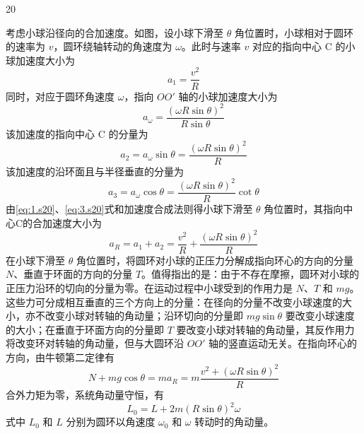 \begin{solution}{20}
    \begin{subsolution}
        考虑小球沿径向的合加速度。如图，设小球下滑至 $\theta$ 角位置时，小球相对于圆环的速率为 $v$，圆环绕轴转动的角速度为 $\omega$。此时与速率 $v$ 对应的指向中心 C 的小球加速度大小为
        \begin{equation}
            a_1 = \frac{v^2}{R}
            \label{eq:1.s20}
        \end{equation}
        同时，对应于圆环角速度 $\omega$，指向 $OO'$ 轴的小球加速度大小为
        \begin{equation}
            a_{\omega} = \frac{(\omega R \sin\theta)^2}{R \sin\theta}
            \label{eq:2.s20}
        \end{equation}
        该加速度的指向中心 C 的分量为
        \begin{equation}
            a_2 = a_{\omega}\sin\theta = \frac{(\omega R \sin\theta)^2}{R}
            \label{eq:3.s20}
        \end{equation}
        该加速度的沿环面且与半径垂直的分量为
        \begin{equation}
            a_3 = a_{\omega}\cos\theta = \frac{(\omega R \sin\theta)^2}{R}\cot\theta
            \label{eq:4.s20}
        \end{equation}
        由\eqref{eq:1.s20}、\eqref{eq:3.s20}式和加速度合成法则得小球下滑至 $\theta$ 角位置时，其指向中心C的合加速度大小为
        \begin{equation}
            a_R = a_1 + a_2 = \frac{v^2}{R} + \frac{(\omega R \sin\theta)^2}{R}
            \label{eq:5.s20}
        \end{equation}
        在小球下滑至 $\theta$ 角位置时，将圆环对小球的正压力分解成指向环心的方向的分量 $N$、垂直于环面的方向的分量 $T$。值得指出的是：由于不存在摩擦，圆环对小球的正压力沿环的切向的分量为零。在运动过程中小球受到的作用力是 $N$、$T$ 和 $mg$。这些力可分成相互垂直的三个方向上的分量：在径向的分量不改变小球速度的大小，亦不改变小球对转轴的角动量；沿环切向的分量即 $mg\sin\theta$ 要改变小球速度的大小；在垂直于环面方向的分量即 $T$ 要改变小球对转轴的角动量，其反作用力将改变环对转轴的角动量，但与大圆环沿 $OO'$ 轴的竖直运动无关。在指向环心的方向，由牛顿第二定律有
        \begin{equation}
            N + mg\cos\theta = m a_R = m\frac{v^2 + (\omega R \sin\theta)^2}{R}
            \label{eq:6.s20}
        \end{equation}
        合外力矩为零，系统角动量守恒，有
        \begin{equation}
            L_0 = L + 2m(R\sin\theta)^2\omega
            \label{eq:7.s20}
        \end{equation}
        式中 $L_0$ 和 $L$ 分别为圆环以角速度 $\omega_0$ 和 $\omega$ 转动时的角动量。


\end{subsolution}
\end{solution}
